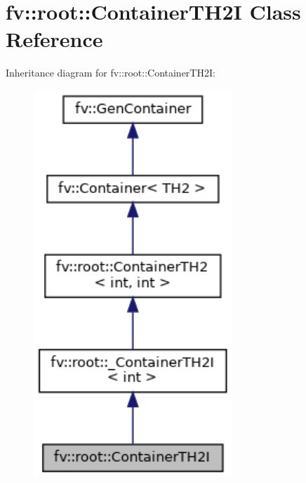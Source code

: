 \hypertarget{classfv_1_1root_1_1ContainerTH2I}{}\section{fv\+:\+:root\+:\+:Container\+T\+H2I Class Reference}
\label{classfv_1_1root_1_1ContainerTH2I}


Inheritance diagram for fv\+:\+:root\+:\+:Container\+T\+H2I\+:
\nopagebreak
\begin{figure}[H]
\begin{center}
\leavevmode
\includegraphics[width=212pt]{classfv_1_1root_1_1ContainerTH2I__inherit__graph}
\end{center}
\end{figure}


